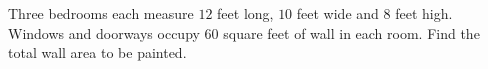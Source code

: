 Three bedrooms each measure $12$ feet long, $10$ feet wide and $8$ feet high. Windows and doorways occupy $60$ square feet of wall in each room. Find the total wall area to be painted.
